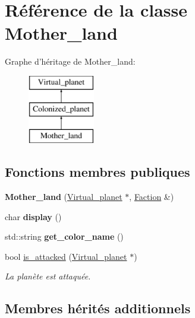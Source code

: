 \hypertarget{classMother__land}{\section{Référence de la classe Mother\-\_\-land}
\label{classMother__land}
}
Graphe d'héritage de Mother\-\_\-land\-:\begin{figure}[H]
\begin{center}
\leavevmode
\includegraphics[height=3.000000cm]{classMother__land}
\end{center}
\end{figure}
\subsection*{Fonctions membres publiques}
\begin{DoxyCompactItemize}
\item 
\hypertarget{classMother__land_a8fd578b591a99a926bebd55959492997}{{\bfseries Mother\-\_\-land} (\hyperlink{classVirtual__planet}{Virtual\-\_\-planet} $\ast$, \hyperlink{classFaction}{Faction} \&)}\label{classMother__land_a8fd578b591a99a926bebd55959492997}

\item 
\hypertarget{classMother__land_ae50ab9634b50efcb8a9f0fe275342923}{char {\bfseries display} ()}\label{classMother__land_ae50ab9634b50efcb8a9f0fe275342923}

\item 
\hypertarget{classMother__land_a2a862d8ca3bf717ef885edc50ea92a8d}{std\-::string {\bfseries get\-\_\-color\-\_\-name} ()}\label{classMother__land_a2a862d8ca3bf717ef885edc50ea92a8d}

\item 
bool \hyperlink{classMother__land_a295325cdedbfcfb17c200a4a7438761c}{is\-\_\-attacked} (\hyperlink{classVirtual__planet}{Virtual\-\_\-planet} $\ast$)
\begin{DoxyCompactList}\small\item\em La planète est attaquée. \end{DoxyCompactList}\end{DoxyCompactItemize}
\subsection*{Membres hérités additionnels}


